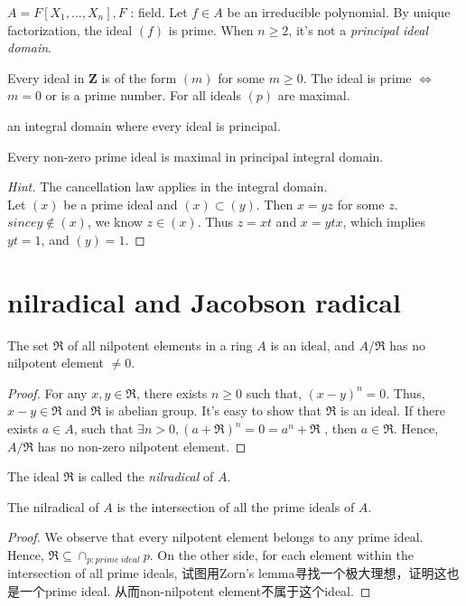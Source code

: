 \documentclass[11pt,fleqn]{book} %
\begin{document}
\begin{CJK}{UTF8}{gkai}
\begin{example}
	$A = F[X_1,...,X_n], F$ : field. Let $f \in A$ be an irreducible polynomial. By unique factorization, the ideal $(f)$ is prime. When $n \geq 2$, it's not a {\it principal ideal domain}.	
\end{example}

\begin{example}
	Every ideal in $\mathbf{Z}$ is of the form $(m)$ for some $m \geq 0$. The ideal is prime $\iff$ $m = 0$ or is a prime number. For all ideals $(p)$ are maximal.
\end{example}

\begin{definition}
	 an integral domain where every ideal is principal.
\end{definition}

\begin{proposition}
	Every non-zero prime ideal is maximal in principal integral domain.
\end{proposition}
\begin{proof}
	[Hint] The cancellation law applies in the integral domain. \\
	Let $(x)$ be a prime ideal and $(x) \subset (y)$. Then $x = yz$ for some $z$. $since y \notin (x)$, we know $z \in (x)$. Thus $z = xt$ and $x = ytx$, which implies $yt = 1$, and $(y) = 1$.
\end{proof}

\section{nilradical and Jacobson radical}
\begin{proposition}
	The set $\mathfrak{R}$ of all nilpotent elements in a ring $A$ is an ideal, and $A / \mathfrak{R}$ has no nilpotent element $\neq 0$.
\end{proposition}
\begin{proof}
	For any $x,y \in \mathfrak{R}$, there exists $n \geq 0$ such that, $(x-y)^n = 0$. Thus, $x - y \in \mathfrak{R}$ and $\mathfrak{R}$ is abelian group. It's easy to show that $\mathfrak{R}$ is an ideal.
	If there exists $a \in A$, such that $\exists n > 0, (a + \mathfrak{R})^n = 0 = a^n + \mathfrak{R}$ , then $a \in \mathfrak{R}$. Hence, $A / \mathfrak{R}$ has no non-zero nilpotent element.
\end{proof}

The ideal $\mathfrak{R}$ is called the {\it nilradical} of $A$.
\begin{proposition}
	The nilradical of $A$ is the intersection of all the prime ideals of $A$.
\end{proposition}
\begin{proof}
	We observe that every nilpotent element belongs to any prime ideal. Hence, $\mathfrak{R} \subseteq \cap_{p:prime \ ideal}p$.
	On the other side, for each element within the intersection of all prime ideals, 试图用Zorn's lemma寻找一个极大理想，证明这也是一个prime ideal. 从而non-nilpotent element不属于这个ideal.
\end{proof}


\end{CJK}
\end{document}
